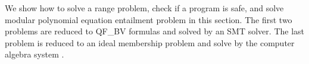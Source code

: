 
We show how to solve a range problem, check if a program is safe, and solve modular polynomial equation
entailment problem in this section.
The first two problems are reduced to QF\_BV formulas and solved by an SMT solver.
The last problem is reduced to an ideal membership problem and solve by the computer algebra system \singular.